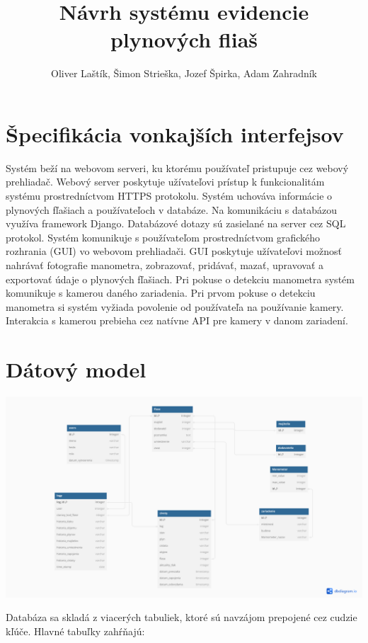 \documentclass{zah}
\title{Návrh systému evidencie plynových fliaš}
\author{Oliver Laštík, Šimon Strieška, Jozef Špirka, Adam Zahradník}
\begin{document}
\maketitle

\tableofcontents
\cleardoublepage

\section{Špecifikácia vonkajších interfejsov}

Systém beží na webovom serveri, ku ktorému používateľ pristupuje cez webový prehliadač. Webový server poskytuje užívateľovi prístup k funkcionalitám systému prostredníctvom HTTPS protokolu. Systém uchováva informácie o plynových fľašiach a používateľoch v databáze. Na komunikáciu s databázou využíva framework Django. Databázové dotazy sú zasielané na server cez SQL protokol. Systém komunikuje s používateľom prostredníctvom grafického rozhrania (GUI) vo webovom prehliadači. GUI poskytuje užívateľovi možnosť nahrávať fotografie manometra, zobrazovať, pridávať, mazať, upravovať a exportovať údaje o plynových fľašiach. Pri pokuse o detekciu manometra systém komunikuje s kamerou daného zariadenia. Pri prvom pokuse o detekciu manometra si systém vyžiada povolenie od používateľa na používanie kamery. Interakcia s kamerou prebieha cez natívne API pre kamery v danom zariadení.

\section{Dátový model}
\includegraphics[width=\textwidth]{navrh-assets/db}

Databáza sa skladá z viacerých tabuliek, ktoré sú navzájom prepojené cez cudzie kľúče. Hlavné tabuľky zahŕňajú:
\end{document}
